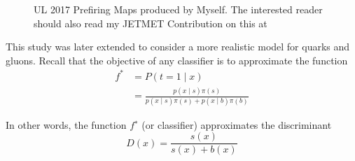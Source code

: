 \begin{figure}[h]%
    \centering
    \qquad
    \caption{UL 2017 Prefiring Maps produced by Myself. The interested reader should also read my JETMET Contribution on this at \cite{UL2017}}%
    \label{QGI}%
\end{figure}
This study was later extended to consider a more realistic model for quarks and gluons. Recall that the objective of any classifier is to approximate the function 
\begin{equation}
    \begin{aligned}
f^{*} &=P(t=1 \mid x) \\
&=\frac{p(x \mid s) \pi(s)}{p(x \mid s) \pi(s)+p(x \mid b) \pi(b)}
\end{aligned}
\end{equation}

In other words, the function $f^∗$ (or classifier) approximates the discriminant
\begin{equation}
    D(x)=\frac{s(x)}{s(x)+b(x)}
\end{equation}

